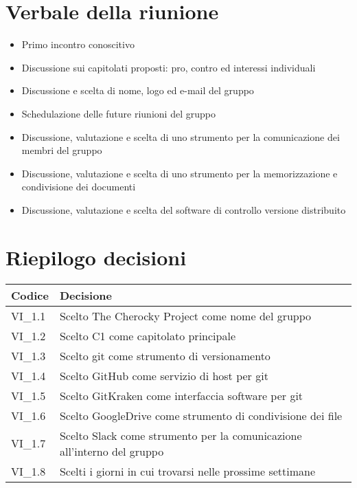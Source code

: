 \documentclass{article}
\begin{document}
	\section{Verbale della riunione}
	\begin{itemize}
	    \item Primo incontro conoscitivo
	    \item Discussione sui capitolati proposti: pro, contro ed interessi individuali
	    \item Discussione e scelta di nome, logo ed e-mail del gruppo
	    \item Schedulazione delle future riunioni del gruppo
	    \item Discussione, valutazione e scelta di uno strumento per la comunicazione dei membri del gruppo
        \item Discussione, valutazione e scelta di uno strumento per la memorizzazione e condivisione dei documenti
        \item Discussione, valutazione e scelta del software di controllo versione distribuito
	\end{itemize}
    \section{Riepilogo decisioni}
    \setlength{\tabcolsep}{18pt}
    \renewcommand{\arraystretch}{1.5}
    { \normalsize\mdseries
    \begin{tabular}{ |p{} p{}| } 
        \hline
        \rowcolor{custom}
        \bfseries\leavevmode\color{white} Codice & \bfseries\leavevmode\color{white} Decisione \\
        \hline\hline
        VI\_1.1 & Scelto The Cherocky Project come nome del gruppo \\
        VI\_1.2 & Scelto C1 come capitolato principale \\
        VI\_1.3 & Scelto git come strumento di versionamento \\
        VI\_1.4 & Scelto GitHub come servizio di host per git \\
        VI\_1.5 & Scelto GitKraken come interfaccia software per git \\
        VI\_1.6 & Scelto GoogleDrive come strumento di condivisione dei file \\
        VI\_1.7 & Scelto Slack come strumento per la comunicazione all'interno del gruppo \\
        VI\_1.8 & Scelti i giorni in cui trovarsi nelle prossime settimane \\
        \hline
    \end{tabular}
    }
\end{document}
